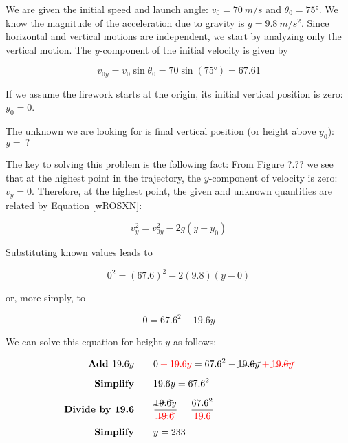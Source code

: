 \documentclass{article}
\begin{document}
\Solution We are given the initial speed and launch angle: $v_0 = \SI{70}{m/s}$ and $\theta_0 = \ang{75}$. We know the magnitude of the acceleration due to gravity is $g = \SI{9.8}{m/s^2}$. Since horizontal and vertical motions are independent, we start by analyzing only the vertical motion. The $y$-component of the initial velocity is given by

\begin{equation*}
    v_{0y} = v_0 \sin{\theta_0} = 70 \sin{(\ang{75})} = 67.61
\end{equation*}

If we assume the firework starts at the origin, its initial vertical position is zero: $y_0 = 0$.

\vspace{1em}

The unknown we are looking for is final vertical position (or height above $y_0$): $y =\ ?$ 

\vspace{1em}

The key to solving this problem is the following fact: From Figure ?.?? we see that at the highest point in the trajectory, the $y$-component of velocity is zero: $v_y = 0$. Therefore, at the highest point, the given and unknown quantities are related by Equation \eqref{wROSXN}:

\begin{equation*}
    v_y^2 = v_{0y}^2 - 2 g \left(y-y_0\right)
\end{equation*}

Substituting known values leads to

\begin{equation*}
    0^2 = \left(67.6\right)^2 - 2 (9.8) \left(y - 0\right)
\end{equation*}

or, more simply, to

\begin{equation*}
    0 = 67.6^2 - 19.6 y
\end{equation*}

We can solve this equation for height $y$ as follows:

\begin{align*}
    \textbf{Add $19.6 y$} \qquad & 0 \mathbin{\color{red} +} \textcolor{red}{19.6 y} = 67.6^2 - \cancel{19.6 y} \mathbin{\color{red} +} \textcolor{red}{\cancel{19.6 y}}\\[1ex]
    \textbf{Simplify} \qquad & 19.6 y = 67.6^2\\[1ex]
    \textbf{Divide by 19.6} \qquad & \frac{\cancel{19.6} y}{\textcolor{red}{\cancel{19.6}}} = \frac{67.6^2}{\textcolor{red}{19.6}}\\[1ex]
    \textbf{Simplify} \qquad & y = 233
\end{align*}
\end{document}
